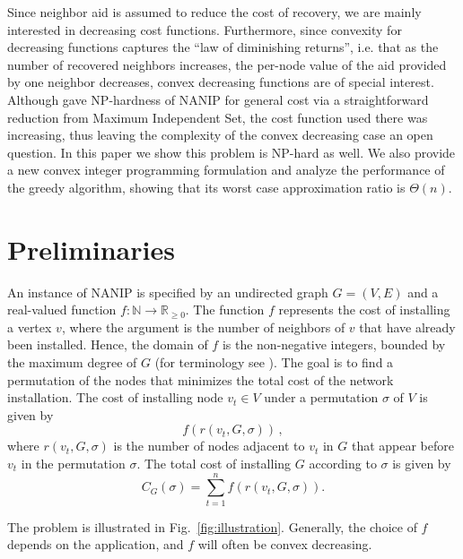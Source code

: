\documentclass[english]{llncs}
\begin{document}
Since neighbor aid is assumed to reduce the cost of recovery, we are mainly
interested in decreasing cost functions. Furthermore, since convexity for
decreasing functions captures the ``law of diminishing returns'', i.e. that as
the number of recovered neighbors increases, the per-node value of the aid
provided by one neighbor decreases, convex decreasing functions are of special
interest. Although \cite{Gutfraind14}  gave NP-hardness of
NANIP for general cost via a straightforward reduction from Maximum Independent
Set, the cost function used there was increasing, thus leaving the complexity
of the convex decreasing case an open question.  In this paper we show this
problem is NP-hard as well.  We also provide a new convex integer programming
formulation and analyze the performance of the greedy algorithm, showing that
its worst case approximation ratio is $\Theta(n)$.


\section{Preliminaries}
An instance of NANIP is specified by an undirected graph $G=(V,E)$ and a
real-valued function $f: \mathbb{N} \to \mathbb{R}_{\geq 0}$. The function $f$
represents the cost of installing a vertex $v$, where the argument is the
number of neighbors of $v$ that have already been installed. Hence, the domain
of $f$ is the non-negative integers, bounded by the maximum degree of $G$ (for
terminology see \cite{West01}).  The goal is to find a permutation of the nodes
that minimizes the total cost of the network installation. The cost of
installing node $v_t \in V$ under a permutation $\sigma$ of $V$ is given by
$$f(r(v_t, G, \sigma))\,,$$ where $r(v_t, G, \sigma)$ is the number of nodes
adjacent to $v_t$ in $G$ that appear before $v_t$ in the permutation $\sigma$.
The total cost of installing $G$ according to $\sigma$ is given by
\begin{equation} C_G(\sigma) = \sum_{t=1}^{n} f(r(v_t, G, \sigma)).
\label{eq:general-NANIP} \end{equation}

The problem is illustrated in Fig.~\ref{fig:illustration}.  Generally, the
choice of $f$ depends on the application, and $f$ will often be convex
decreasing. 
\end{document}
